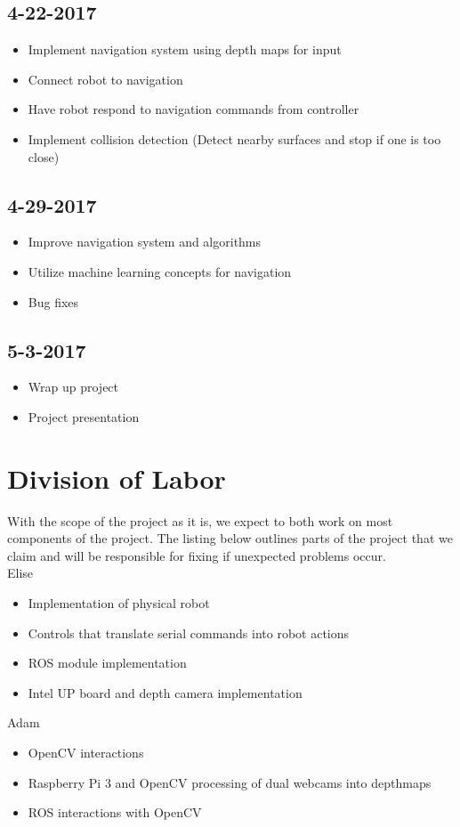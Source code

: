 \documentclass[11pt]{amsart}
\begin{document}
\subsection*{4-22-2017}
\begin{itemize}
\item Implement navigation system using depth maps for input
\item Connect robot to navigation
\item Have robot respond to navigation commands from controller
\item Implement collision detection (Detect nearby surfaces and stop if one is too close)
\end{itemize}

\subsection*{4-29-2017}
\begin{itemize}
\item Improve navigation system and algorithms
\item Utilize machine learning concepts for navigation
\item Bug fixes
\end{itemize}

\subsection*{5-3-2017}
\begin{itemize}
\item Wrap up project
\item Project presentation
\end{itemize}

\section{Division of Labor}
With the scope of the project as it is, we expect to both work on most components of the project.  The listing below outlines parts of the project that we claim and will be responsible for fixing if unexpected problems occur.\\

Elise
\begin{itemize}
\item Implementation of physical robot
\item Controls that translate serial commands into robot actions
\item ROS module implementation
\item Intel UP board and depth camera implementation
\end{itemize}

Adam
\begin{itemize}
\item OpenCV interactions
\item Raspberry Pi 3 and OpenCV processing of dual webcams into depthmaps
\item ROS interactions with OpenCV
\end{itemize}
\end{document}
